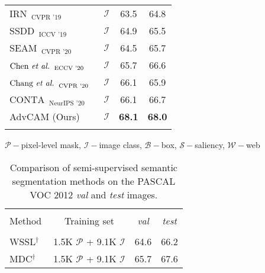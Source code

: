 \documentclass[final]{cvpr}
\begin{document}
\begin{table}[t]
\begin{threeparttable}
\begin{tabular}{l@{\hskip 0.3in}c@{\hskip 0.3in}cc}
    $\text{IRN}_{\text{~~CVPR '19}}$~\cite{ahn2019weakly}  &  $\mathcal{I}$ & 63.5 & 64.8 \\
    $\text{SSDD}_{\text{~~ICCV '19}}$~\cite{Shimoda_2019_ICCV}    & $\mathcal{I}$   & 64.9  & 65.5\\
    $\text{SEAM}_{\text{~~CVPR '20}}$~\cite{wang2020self}    & $\mathcal{I}$ & 64.5  & 65.7 \\
$\text{Chen \textit{et al.}}_{\text{~~ECCV '20}}$~\cite{chenweakly}   &   $\mathcal{I}$ & 65.7  & 66.6  \\

    $\text{Chang \textit{et al.}}_{\text{~~CVPR '20}}$~\cite{chang2020weakly}   & $\mathcal{I}$  & 66.1  & 65.9\\


    $\text{CONTA}_{\text{~~NeurIPS '20}}$~\cite{zhang2020causal}   & $\mathcal{I}$  & 66.1  & 66.7  \\

    AdvCAM (Ours) & $\mathcal{I}$ & \textbf{68.1} & \textbf{68.0}  \\
\Xhline{1pt}
    
    \end{tabular}\begin{tablenotes}
  \footnotesize
\item $\mathcal{P}-$pixel-level mask, $\mathcal{I}-$image class, $\mathcal{B}-$box, $\mathcal{S}-$saliency, $\mathcal{W}-$web\\
\scriptsize
\end{tablenotes}
     \end{threeparttable}
\vspace{-1em}

      \end{table} \begin{table}[tbp]
\renewcommand{\arraystretch}{0.95}
  \centering  \caption{Comparison of semi-supervised semantic segmentation methods on the PASCAL VOC 2012 \textit{val} and \textit{test} images.}
\vspace{-0.7em}
\begin{threeparttable}
    \begin{tabular}{l@{\hskip 0.1in}c@{\hskip 0.15in}cc}
    \Xhline{1pt}\\[-0.95em]
    Method & Training set & \textit{val} & \textit{test}    \\
    \hline\hline\\[-0.95em]
WSSL$^{\dagger}$~\cite{papandreou2015weakly}  & 1.5K $\mathcal{P}$ + 9.1K $\mathcal{I}$ & 64.6 & 66.2 \\
MDC$^{\dagger}$~\cite{wei2018revisiting}  & 1.5K $\mathcal{P}$ + 9.1K $\mathcal{I}$ & 65.7 & 67.6\\
    

\end{tabular}
\end{threeparttable}
\end{table}
\end{document}
